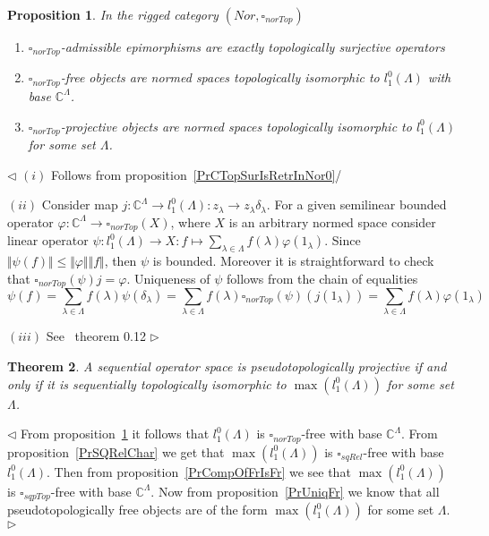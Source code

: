 \documentclass[12pt]{article}
\newtheorem{theorem}{Theorem}[subsection]
\newtheorem{proposition}[theorem]{Proposition}
\newenvironment{proof}{\par $\triangleleft$}{$\triangleright$}
\begin{document}
\begin{proposition}\label{PrNorTopChar}
In the rigged category $(Nor, \square_{norTop})$
\begin{enumerate}[label = (\roman*)]
    \item $\square_{norTop}$-admissible epimorphisms are exactly 
    topologically surjective operators

    \item $\square_{norTop}$-free objects are normed spaces topologically 
    isomorphic to $l_1^0(\Lambda)$ with base $\mathbb{C}^\Lambda$.

    \item $\square_{norTop}$-projective objects are normed spaces 
topologically isomorphic to $l_1^0(\Lambda)$ for some set $\Lambda$. 
\end{enumerate}
\end{proposition}
\begin{proof}
$(i)$ Follows from proposition~\ref{PrCTopSurIsRetrInNor0}/

$(ii)$ Consider 
map $j:\mathbb{C}^\Lambda\to l_1^0(\Lambda)
:z_\lambda\to z_\lambda\delta_\lambda$. For a given semilinear 
bounded operator $\varphi:\mathbb{C}^\Lambda\to\square_{norTop}(X)$, 
where $X$ is an arbitrary normed space consider linear operator 
$\psi:l_1^0(\Lambda)\to X
:f\mapsto\sum_{\lambda\in\Lambda}f(\lambda)\varphi(1_\lambda)$. 
Since $\Vert\psi(f)\Vert\leq\Vert\varphi\Vert\Vert f\Vert$, 
then $\psi$ is bounded. Moreover it is straightforward to check 
that $\square_{norTop}(\psi)j=\varphi$. Uniqueness of $\psi$ follows 
from the chain of equalities 
$$
\psi(f)=\sum_{\lambda\in\Lambda}
f(\lambda)\psi(\delta_\lambda)=\sum_{\lambda\in\Lambda}
f(\lambda)\square_{norTop}(\psi)(j(1_\lambda))=\sum_{\lambda\in\Lambda}
f(\lambda)\varphi(1_\lambda)
$$

$(iii)$ See~\cite{GroTopNorPr} theorem 0.12
\end{proof}

\begin{theorem}\label{ThPsTopFrDesc}
A sequential  operator space is pseudotopologically projective if and only if 
it is sequentially topologically isomorphic to $\max(l_1^0(\Lambda))$ 
for some set $\Lambda$.
\end{theorem}
\begin{proof}
From proposition~\ref{PrNorTopChar} it follows that $l_1^0(\Lambda)$ 
is $\square_{norTop}$-free with base  $\mathbb{C}^\Lambda$. 
From proposition~\ref{PrSQRelChar} we get that $\max(l_1^0(\Lambda))$ 
is  $\square_{sqRel}$-free with base $l_1^0(\Lambda)$. Then 
from proposition~\ref{PrCompOfFrIsFr} we see that $\max(l_1^0(\Lambda))$ 
is $\square_{sqpTop}$-free with base $\mathbb{C}^\Lambda$. Now 
from proposition~\ref{PrUniqFr} we know that all pseudotopologically free 
objects are of the form $\max(l_1^0(\Lambda))$ for some set $\Lambda$.
\end{proof}
\end{document}
